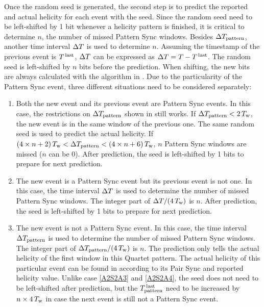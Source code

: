 Once the random seed is generated, the second step is to predict the reported and actual helicity for each event with the seed. Since the random seed need to be left-shifted by 1 bit whenever a helicity pattern is finished, it is critical to determine $n$, the number of missed Pattern Sync windows. Besides $\Delta T_{\text{pattern}}$, another time interval $\Delta T$ is used to determine $n$. Assuming the timestamp of the previous event is $T^{\,\text{last}}$, $\Delta T$ can be expressed as $\Delta T=T-T^{\,\text{last}}$. The random seed is left-shifted by $n$ bits before the prediction. When shifting, the new bits are always calculated with the algorithm in . Due to the particularity of the Pattern Sync event, three different situations need to be considered separately:
\begin{enumerate}[parsep=0pt]
\item \label{A2S2A3} Both the new event and its previous event are Pattern Sync events. In this case, the restrictions on $\Delta T_{\text{pattern}}$ shown in  still works. If $\Delta T_{\text{pattern}}<2\,T_{\text{w}}$, the new event is in the same window of the previous one. The same random seed is used to predict the actual helicity. If $(4\times n+2)\,T_{\text{w}}<\Delta T_{\text{pattern}}<(4\times n+6)\,T_{\text{w}}$, $n$ Pattern Sync windows are missed ($n$ can be 0). After prediction, the seed is left-shifted by 1 bits to prepare for next prediction.
\item \label{A2S2A4} The new event is a Pattern Sync event but its previous event is not one. In this case, the time interval $\Delta T$ is used to determine the number of missed Pattern Sync windows. The integer part of $\Delta T/(4\,T_{\text{w}})$ is $n$. After prediction, the seed is left-shifted by 1 bits to prepare for next prediction.
\item The new event is not a Pattern Sync event. In this case, the time interval $\Delta T_{\text{pattern}}$ is used to determine the number of missed Pattern Sync windows. The integer part of $\Delta T_{\text{pattern}}/(4\,T_{\text{w}})$ is $n$. The prediction only tells the actual helicity of the first window in this Quartet pattern. The actual helicity of this particular event can be found in  according to its Pair Sync and reported helicity value. Unlike case \ref{A2S2A3} and \ref{A2S2A4}, the seed does not need to be left-shifted after prediction, but the $T^{\,\text{last}}_{\text{pattern}}$ need to be increased by $n\times4\,T_{\text{w}}$ in case the next event is still not a Pattern Sync event.
\end{enumerate}

